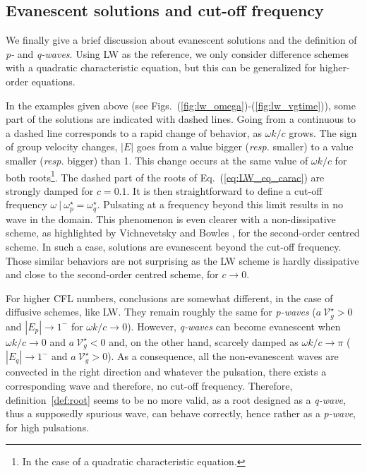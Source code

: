 
\subsection{Evanescent solutions and cut-off frequency \label{sec:cutoff}}
\noindent We finally give a brief discussion about evanescent solutions and the definition of {\it p-} and {\it q-waves}. Using LW as the reference, we only consider difference schemes with a quadratic characteristic equation, but this can be generalized for higher-order equations.

\noindent In the examples given above (see Figs.~(\ref{fig:lw_omega})-(\ref{fig:lw_vgtime})), some part of the solutions are indicated with dashed lines. Going from a continuous to a dashed line corresponds to a rapid change of behavior, as $\omega k / c$ grows. The sign of group velocity changes, $|E|$ goes from a value bigger ({\it resp.} smaller) to a value smaller ({\it resp.} bigger) than 1. This change occurs at the same value of $\omega k / c$ for both roots\footnote{In the case of a quadratic characteristic equation.}. The dashed part of the roots of Eq.~(\ref{eq:LW_eq_carac}) are strongly damped for $c=0.1$. It is then straightforward to define a cut-off frequency $\omega ~|~\omega^{\star}_p = \omega^{\star}_q$. Pulsating at a frequency beyond this limit results in no wave in the domain. This phenomenon is even clearer with a non-dissipative scheme, as highlighted by Vichnevetsky and Bowles \cite{Vichnevetsky:1982}, for the second-order centred scheme. In such a case, solutions are evanescent beyond the cut-off frequency. Those similar behaviors are not surprising as the LW scheme is hardly dissipative and close to the second-order centred scheme, for $c \rightarrow 0$. 

\noindent For higher CFL numbers, conclusions are somewhat different, in the case of diffusive schemes, like LW. They remain roughly the same for {\it p-waves} ($a ~\mathcal{V}_{g}^{\star} > 0$ and $\left| E_p\right| \rightarrow 1^-$ for $\omega k / c \rightarrow 0$). However, {\it q-waves} can become evanescent when $\omega k / c \rightarrow 0$ and $a ~\mathcal{V}_{g}^{\star} < 0$ and, on the other hand, scarcely damped as $\omega k / c \rightarrow \pi$ ($\left| E_q\right| \rightarrow 1^-$ and $a ~\mathcal{V}_{g}^{\star} > 0$). As a consequence, all the non-evanescent waves are convected in the right direction and whatever the pulsation, there exists a corresponding wave and therefore, no cut-off frequency. Therefore, definition~\ref{def:root} seems to be no more valid, as a root designed as a {\it q-wave}, thus a supposedly spurious wave, can  behave correctly, hence rather as a {\it p-wave}, for high pulsations.


